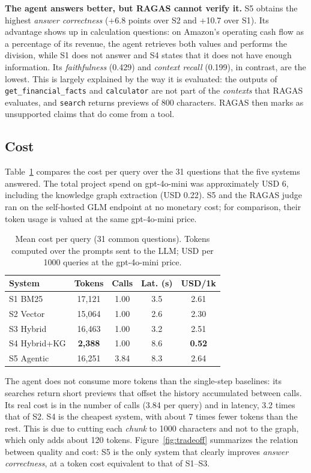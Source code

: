 \documentclass[conference]{IEEEtran}
\begin{document}
\textbf{The agent answers better, but RAGAS cannot verify it.} S5 obtains the highest \textit{answer correctness} (+6.8 points over S2 and +10.7 over S1). Its advantage shows up in calculation questions: on Amazon's operating cash flow as a percentage of its revenue, the agent retrieves both values and performs the division, while S1 does not answer and S4 states that it does not have enough information. Its \textit{faithfulness} (0.429) and \textit{context recall} (0.199), in contrast, are the lowest. This is largely explained by the way it is evaluated: the outputs of \texttt{get\_financial\_facts} and \texttt{calculator} are not part of the \textit{contexts} that RAGAS evaluates, and \texttt{search} returns previews of 800 characters. RAGAS then marks as unsupported claims that do come from a tool.

\subsection{Cost}
Table~\ref{tab:costos} compares the cost per query over the 31 questions that the five systems answered. The total project spend on gpt-4o-mini was approximately USD 6, including the knowledge graph extraction (USD 0.22). S5 and the RAGAS judge ran on the self-hosted GLM endpoint at no monetary cost; for comparison, their token usage is valued at the same gpt-4o-mini price.

\begin{table}[h]
\centering
\small
\begin{tabular}{lcccc}
\toprule
\textbf{System} & \textbf{Tokens} & \textbf{Calls} & \textbf{Lat. (s)} & \textbf{USD/1k} \\
\midrule
S1 BM25      & 17{,}121 & 1.00 & 3.5 & 2.61 \\
S2 Vector    & 15{,}064 & 1.00 & 2.6 & 2.30 \\
S3 Hybrid    & 16{,}463 & 1.00 & 3.2 & 2.51 \\
S4 Hybrid+KG & \textbf{2{,}388} & 1.00 & 8.6 & \textbf{0.52} \\
S5 Agentic   & 16{,}251 & 3.84 & 8.3 & 2.64 \\
\bottomrule
\end{tabular}
\caption{Mean cost per query (31 common questions). Tokens computed over the prompts sent to the LLM; USD per 1000 queries at the gpt-4o-mini price.}
\label{tab:costos}
\end{table}

The agent does not consume more tokens than the single-step baselines: its searches return short previews that offset the history accumulated between calls. Its real cost is in the number of calls (3.84 per query) and in latency, 3.2 times that of S2. S4 is the cheapest system, with about 7 times fewer tokens than the rest. This is due to cutting each \textit{chunk} to 1000 characters and not to the graph, which only adds about 120 tokens. Figure~\ref{fig:tradeoff} summarizes the relation between quality and cost: S5 is the only system that clearly improves \textit{answer correctness}, at a token cost equivalent to that of S1--S3.
\end{document}
